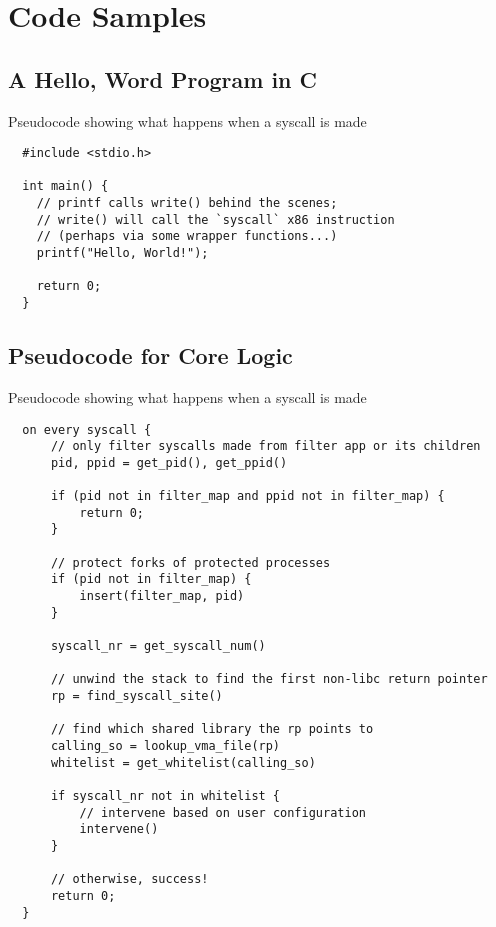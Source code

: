 \appendix
\section{Code Samples}

\subsection{A Hello, Word Program in C}

\begin{listing}[H]
  \caption{Pseudocode showing what happens when a syscall is
  made}\label{lst:hello-world}
  \begin{verbatim}
  #include <stdio.h>

  int main() {
    // printf calls write() behind the scenes;
    // write() will call the `syscall` x86 instruction 
    // (perhaps via some wrapper functions...)
    printf("Hello, World!");

    return 0;
  }
 \end{verbatim}
\end{listing}



\subsection{Pseudocode for \af Core Logic}\label{subsec:apx-af-pseudocode}

\begin{listing}[H]
  \caption{Pseudocode showing what happens when a syscall is made}\label{lst:syscall-filter}
  \begin{verbatim}
  on every syscall {
      // only filter syscalls made from filter app or its children
      pid, ppid = get_pid(), get_ppid()

      if (pid not in filter_map and ppid not in filter_map) {
          return 0;
      }

      // protect forks of protected processes
      if (pid not in filter_map) {
          insert(filter_map, pid)
      }

      syscall_nr = get_syscall_num()

      // unwind the stack to find the first non-libc return pointer
      rp = find_syscall_site()

      // find which shared library the rp points to
      calling_so = lookup_vma_file(rp)
      whitelist = get_whitelist(calling_so)

      if syscall_nr not in whitelist {
          // intervene based on user configuration
          intervene()
      }

      // otherwise, success!
      return 0;
  }
  \end{verbatim}
\end{listing}

